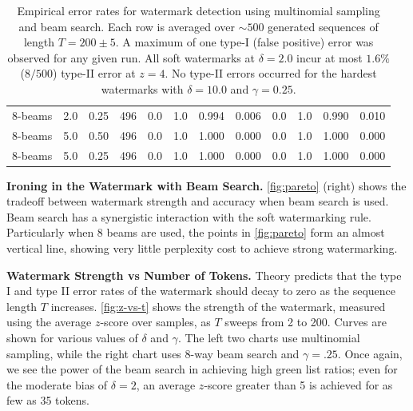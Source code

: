 \documentclass{article}
\theoremstyle{plain}
\theoremstyle{definition}
\theoremstyle{remark}
\begin{document}
\begin{table}[h]
\begin{tabular}{lrrrrrrrrrrr}
        8-beams &    2.0 &   0.25 &    496 &                  0.0 &                  1.0 &            0.994 &            0.006 &                  0.0 &                  1.0 &            0.990 &            0.010 \\
        8-beams &    5.0 &   0.50 &    496 &                  0.0 &                  1.0 &            1.000 &            0.000 &                  0.0 &                  1.0 &            1.000 &            0.000 \\
        8-beams &    5.0 &   0.25 &    496 &                  0.0 &                  1.0 &            1.000 &            0.000 &                  0.0 &                  1.0 &            1.000 &            0.000 \\
\bottomrule
\end{tabular}
\caption{Empirical error rates for watermark detection using multinomial sampling and beam search. Each row is averaged over $\sim500$ generated sequences of length $T=200\pm5$. 
A maximum of one type-I (false positive) error was observed for any given run. All soft watermarks at $\delta=2.0$ incur at most $1.6\%$ ($8/500$) type-II error at $z=4$. No type-II errors occurred for the hardest watermarks with $\delta=10.0$ and $\gamma=0.25$.}
\label{tab:joint-acc}
\vspace{-.2cm}
\end{table}

\textbf{Ironing in the Watermark with Beam Search.}
\cref{fig:pareto} (right) shows the tradeoff between watermark strength and accuracy when beam search is used.
Beam search has a synergistic interaction with the soft watermarking rule. 
Particularly when 8 beams are used, the points in \cref{fig:pareto} form an almost vertical line, showing very little perplexity cost to achieve strong watermarking.


\textbf{Watermark Strength vs Number of Tokens.}
Theory predicts that the type I and type II error rates of the watermark should decay to zero as the sequence length $T$ increases.  
\cref{fig:z-vs-t} shows the strength of the watermark, measured using the average $z$-score over samples, as $T$ sweeps from 2 to 200.  Curves are shown for various values of $\delta$ and $\gamma$.  The left two charts use multinomial sampling, while the right chart uses 8-way beam search and $\gamma=.25$.  Once again, we see the power of the beam search in achieving high green list ratios; even for the moderate bias of $\delta=2$, an average $z$-score greater than 5 is achieved for as few as 35 tokens. 
\end{document}
